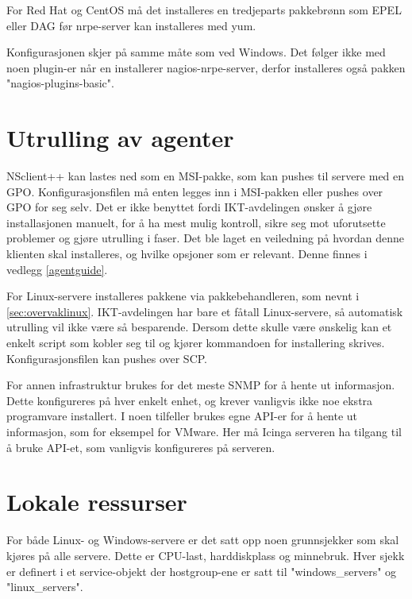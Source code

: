 For Red Hat og CentOS må det installeres en tredjeparts pakkebrønn som EPEL eller DAG før nrpe-server kan installeres med yum.


Konfigurasjonen skjer på samme måte som ved Windows. Det følger ikke med noen plugin-er når en installerer nagios-nrpe-server, derfor installeres også pakken "nagios-plugins-basic".

\section{Utrulling av agenter}
NSclient++ kan lastes ned som en MSI-pakke, som kan pushes til servere med en GPO. Konfigurasjonsfilen må enten legges inn i MSI-pakken eller pushes over GPO for seg selv. Det er ikke benyttet fordi IKT-avdelingen ønsker å gjøre installasjonen manuelt, for å ha mest mulig kontroll, sikre seg mot uforutsette problemer og gjøre utrulling i faser. Det ble laget en veiledning på hvordan denne klienten skal installeres, og hvilke opsjoner som er relevant. Denne finnes i vedlegg \ref{agentguide}.

For Linux-servere installeres pakkene via pakkebehandleren, som nevnt i \ref{sec:overvaklinux}. IKT-avdelingen har bare et fåtall Linux-servere, så automatisk utrulling vil ikke være så besparende. Dersom dette skulle være ønskelig kan et enkelt script som kobler seg til og kjører kommandoen for installering skrives. Konfigurasjonsfilen kan pushes over SCP.

For annen infrastruktur brukes for det meste SNMP for å hente ut informasjon. Dette konfigureres på hver enkelt enhet, og krever vanligvis ikke noe ekstra programvare installert. I noen tilfeller brukes egne API-er for å hente ut informasjon, som for eksempel for VMware. Her må Icinga serveren ha tilgang til å bruke API-et, som vanligvis konfigureres på serveren.

\section{Lokale ressurser}
For både Linux- og Windows-servere er det satt opp noen grunnsjekker som skal kjøres på alle servere. Dette er CPU-last, harddiskplass og minnebruk. Hver sjekk er definert i et service-objekt der hostgroup-ene er satt til "windows\_servers" og "linux\_servers". 

